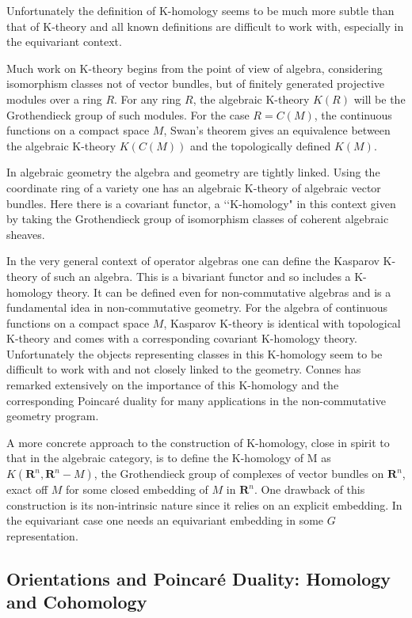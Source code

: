 \documentclass[a4paper,a4paper]{article}
\theoremstyle{conjecture}
\begin{document}
Unfortunately the definition of K-homology seems to be much more subtle
than that of K-theory and all known definitions are difficult to work with,
especially in the equivariant context.

Much work on K-theory begins from the point of view of algebra, considering
isomorphism classes not of vector bundles, but of finitely generated
projective modules over a ring $R$.  For any ring $R$, the algebraic K-theory $K(R)$
will be the Grothendieck group of such modules.
For the case $R=C(M)$, the
continuous
functions on a compact space $M$, Swan's theorem gives an equivalence between
the algebraic K-theory $K(C(M))$ and the topologically defined $K(M)$.

In algebraic geometry the algebra and geometry are tightly linked.
Using the coordinate ring of a variety one has an algebraic K-theory of
algebraic vector bundles.  Here there is a covariant functor, a \lq\lq K-homology"
in this context given by taking the Grothendieck group of isomorphism
classes of coherent algebraic sheaves.

In the very general context of operator algebras one can define the
Kasparov K-theory of such an algebra.  This is a bivariant functor
and so includes a K-homology theory.  It can be defined even for non-commutative
algebras and is a fundamental idea in non-commutative geometry.  For the
algebra of continuous functions on a compact space $M$, Kasparov K-theory
is identical with topological
K-theory and comes with a corresponding covariant K-homology theory.
Unfortunately the objects representing classes in this K-homology seem
to be difficult to work with and not closely linked to the geometry.
Connes \cite{Connes} has remarked extensively on the importance of this K-homology
and the corresponding Poincar\'e duality for many applications in the
non-commutative geometry program.

A more concrete approach to the construction of K-homology, close
in spirit to that in the algebraic category, is to define the K-homology
of M as $K(\mathbf R^n, \mathbf R^n - M)$,
the Grothendieck group of complexes of vector bundles on $\mathbf R^n$,
exact off $M$ for some closed embedding of $M$ in $\mathbf R^n$.
One drawback of this construction is its non-intrinsic nature since
it relies on an explicit embedding.  In the equivariant case one
needs an equivariant embedding in some $G$ representation.


\subsection {Orientations and Poincar\'e Duality: Homology and Cohomology}
\end{document}

